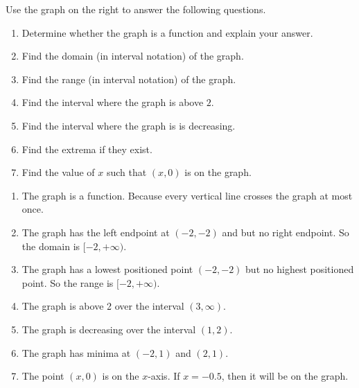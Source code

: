 \begin{example}
  Use the graph on the right to answer the following questions.
\begin{multicols}{2} 
\begin{enumerate}[label={(\arabic*)~}]
\item Determine whether the graph is a function and explain your answer.
\item Find the domain (in interval notation) of the graph.
\item Find the range (in interval notation) of the graph.
\item Find the interval where the graph is above $2$.
\item Find the interval where the graph is is decreasing.
\item Find the extrema if they exist.
\item Find the value of $x$ such that $(x, 0)$ is on the graph.
\end{enumerate}

\columnbreak

\begin{center}
\end{center}

\end{multicols}

\end{example}
\vspace*{-\baselineskip}
\begin{solution}
  \begin{enumerate}[label={\emph{(\arabic*)}~}]
  \item The graph is a function. Because every vertical line crosses the graph at most once.
  \item The graph has the left endpoint  at $(-2, -2)$ and but no right endpoint. So the domain is $[-2, +\infty)$.
  \item The graph has a lowest positioned point $(-2, -2)$ but no highest positioned point. So the range is $[-2, +\infty)$.
  \item The graph is above 2 over the interval $(3, \infty)$.
  \item The graph is decreasing over the interval $(1,2)$.
  \item The graph has minima at $(-2,1)$ and $(2,1)$.
  \item The point $(x, 0)$ is on the $x$-axis. If $x=-0.5$, then it will be on the graph.
  \end{enumerate}
\end{solution}



